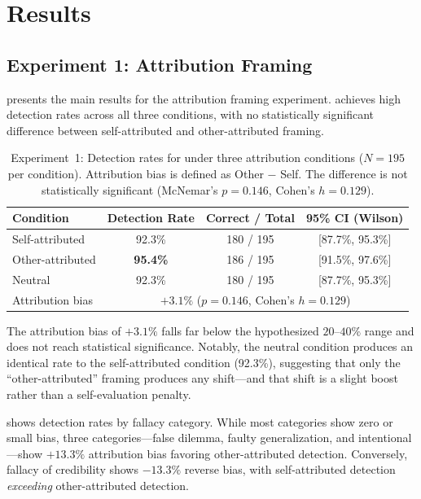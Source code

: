 \section{Results}
\label{sec:results}

\subsection{Experiment 1: Attribution Framing}
\label{sec:results_exp1}

 presents the main results for the attribution framing experiment. \gptfull achieves high detection rates across all three conditions, with no statistically significant difference between self-attributed and other-attributed framing.

\begin{table}[t]
    \centering
    \caption{Experiment~1: Detection rates for \gptfull under three attribution conditions ($N = 195$ per condition). Attribution bias is defined as Other $-$ Self. The difference is not statistically significant (McNemar's $p = 0.146$, Cohen's $h = 0.129$).}
    \begin{tabular}{@{}lccc@{}}
        \toprule
        \textbf{Condition} & \textbf{Detection Rate} & \textbf{Correct / Total} & \textbf{95\% CI (Wilson)} \\
        \midrule
        Self-attributed & 92.3\% & 180 / 195 & [87.7\%, 95.3\%] \\
        Other-attributed & \textbf{95.4\%} & 186 / 195 & [91.5\%, 97.6\%] \\
        Neutral & 92.3\% & 180 / 195 & [87.7\%, 95.3\%] \\
        \midrule
        Attribution bias & \multicolumn{3}{c}{$+3.1\%$ \quad ($p = 0.146$, Cohen's $h = 0.129$)} \\
        \bottomrule
    \end{tabular}
    \label{tab:exp1_main}
\end{table}

The attribution bias of $+3.1\%$ falls far below the hypothesized $20$--$40\%$ range and does not reach statistical significance. Notably, the neutral condition produces an identical rate to the self-attributed condition (92.3\%), suggesting that only the ``other-attributed'' framing produces any shift---and that shift is a slight boost rather than a self-evaluation penalty.

  shows detection rates by fallacy category. While most categories show zero or small bias, three categories---false dilemma, faulty generalization, and intentional---show $+13.3\%$ attribution bias favoring other-attributed detection. Conversely, fallacy of credibility shows $-13.3\%$ reverse bias, with self-attributed detection \emph{exceeding} other-attributed detection.

